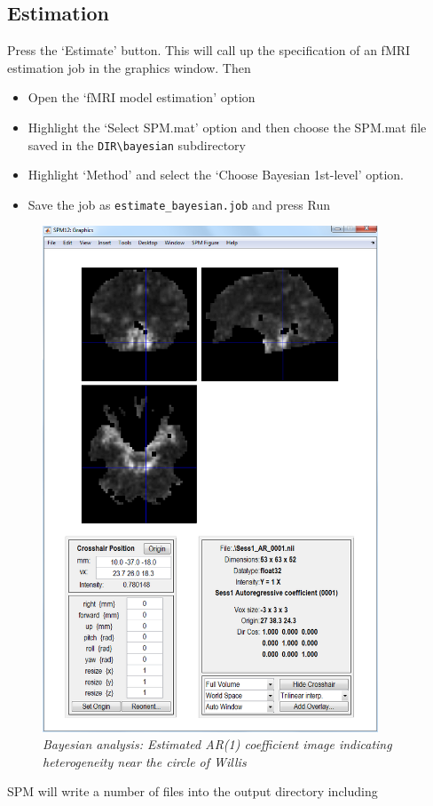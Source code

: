 \documentclass[a4paper,titlepage]{book}
\newcommand{\bi}{\begin{itemize}}
\newcommand{\ei}{\end{itemize}}
\begin{document}
\subsection{Estimation}

Press the `Estimate' button. This will call up the specification of an fMRI estimation job in the graphics window. Then
\bi
\item{Open the `fMRI model estimation' option}
\item{Highlight the `Select SPM.mat' option and then choose the SPM.mat
file saved in the \verb!DIR\bayesian! subdirectory}
\item{Highlight `Method' and select the `Choose Bayesian 1st-level' option.}
\item{Save the job as \verb!estimate_bayesian.job! and press Run}
\ei
\begin{figure}
\begin{center}
\includegraphics[width=100mm]{faces/face_ar1}
\caption{\em Bayesian analysis: Estimated AR(1) coefficient image indicating heterogeneity near the circle of Willis \label{face_ar1} }
\end{center}
\end{figure}
SPM will write a number of files into the output directory including 
\end{document}

